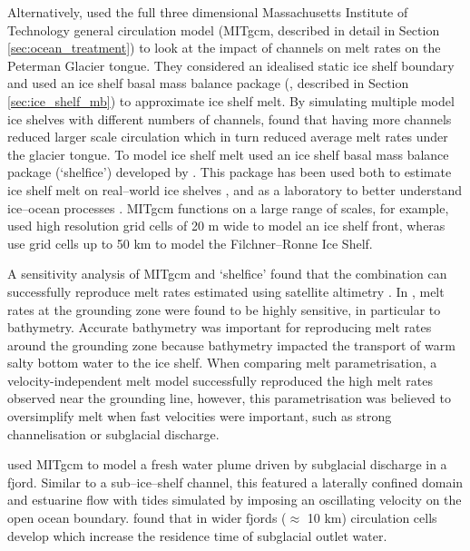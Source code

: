 Alternatively, \cite{millgate2013effect} used the full three dimensional Massachusetts Institute of Technology general circulation model (MITgcm, described in detail in Section \ref{sec:ocean_treatment}) to look at the impact of channels on melt rates on the Peterman Glacier tongue. They considered an idealised static ice shelf boundary and used an ice shelf basal mass balance package (\cite{losch2008modeling}, described in Section \ref{sec:ice_shelf_mb}) to approximate ice shelf melt. By simulating multiple model ice shelves with different numbers of channels, \citeauthor{millgate2013effect} found that having more channels reduced larger scale circulation which in turn reduced average melt rates under the glacier tongue.
To model ice shelf melt \cite{millgate2013effect} used an ice shelf basal mass balance package (`shelfice') developed by \cite{losch2008modeling}. This package has been used both to estimate ice shelf melt on real--world ice shelves \citep[e.g.][]{goldberg2019accurately}, and as a laboratory to better understand ice--ocean processes \citep[e.g.][]{xu2012numerical}. MITgcm functions on a large range of scales, for example, \cite{xu2012numerical} used high resolution grid cells of 20 m wide to model an ice shelf front, wheras \cite{naughten2021two} use grid cells up to 50 km to model the Filchner–Ronne Ice Shelf. 

A sensitivity analysis of MITgcm and `shelfice' found that the combination can successfully reproduce melt rates estimated using satellite altimetry \citep{goldberg2019accurately}. In \cite{goldberg2019accurately}, melt rates at the grounding zone were found to be highly sensitive, in particular to bathymetry. Accurate bathymetry was important for reproducing melt rates around the grounding zone because bathymetry impacted the transport of warm salty bottom water to the ice shelf. When comparing melt parametrisation, a velocity-independent melt model successfully reproduced the high melt rates observed near the grounding line, however, this parametrisation was believed to oversimplify melt when fast velocities were important, such as strong channelisation or subglacial discharge.


\cite{carroll2017subglacial} used MITgcm to model a fresh water plume driven by subglacial discharge in a fjord.  Similar to a sub--ice--shelf channel, this featured a laterally confined domain and estuarine flow with tides simulated by imposing an oscillating velocity on the open ocean boundary. \cite{carroll2017subglacial} found that in wider fjords ($\approx$ 10 km) circulation cells develop which increase the residence time of subglacial outlet water. 

